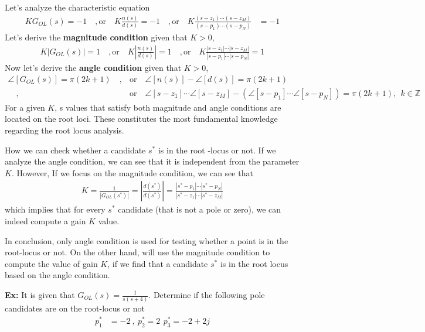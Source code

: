 \documentclass[twoside]{article}
\begin{document}
Let's analyze the characteristic equation 
%
\begin{align*}
K G_{OL}(s) = -1 \quad , \mathrm{or} \quad K \frac{n(s)}{d(s)} = -1 
\quad , \mathrm{or} \quad 
K \frac{(s - z_1) \cdots (s - z_M)}{(s - p_1) \cdots (s - p_N)} 
&= -1
\end{align*}
%
Let's derive the \textbf{magnitude condition} given that $K > 0$,
%
\begin{align*}
K | G_{OL}(s) | = 1 \quad , \mathrm{or} \quad K  \left| \frac{n(s)}{d(s)} \right| = 1 
\quad , \mathrm{or} \quad 
K \frac{|s - z_1| \cdots |s - z_M|}{|s - p_1| \cdots |s - p_N|}  = 1
\end{align*}
%
Now let's derive the \textbf{angle condition} given that $K > 0$,
%
\begin{align*}
\angle [ G_{OL}(s) ] = \pi (2 k + 1) 
\quad ,  &\mathrm{or} \quad 
\angle [n(s)] - \angle [d(s)] = \pi (2 k + 1) 
\\
\quad , &\mathrm{or} \quad 
\angle [s - z_1] \cdots \angle [s - z_M] - \left( \angle [s - p_1] \cdots \angle [s - p_N] \right)
= \pi (2 k + 1), 
\ \ k \in \mathbb{Z} 
\end{align*}
%
For a given $K$, s values that satisfy both magnitude and angle
conditions are located on the root loci. These constitutes the most
fundamental knowledge regarding the root locus analysis.

How we can check whether a candidate $s^*$ is in the root -locus or not.
If we analyze the angle condition, we can see that it is independent 
from the parameter $K$. However, If we focus on the magnitude condition, 
we can see that 
%
\begin{align*}
K = \frac{1}{| G_{OL}(s^*) |} = \left| \frac{d(s^*)}{d(s^*)} \right| = 
\frac{|s^* - p_1| \cdots |s^* - p_N|}{|s^* - z_1| \cdots |s^* - z_M|} 
\end{align*}
%
which implies that for every $s^*$ candidate (that is not a pole or zero), 
we can indeed compute a gain $K$ value.

In conclusion, only angle condition is used for testing 
whether a point is in the root-locus or not. On the other hand, 
will use the magnitude condition to compute the 
value of gain $K$, if we find that a candidate $s^*$
is in the root locus based on the angle condition.

\newpage

\textbf{Ex:} It is given that $G_{OL}(s) = \frac{1}{s (s+4)}$.
Determine if the following pole candidates are on the 
root-locus or not
%
\begin{align*}
	p_1^* &= -2  \ , \  p_2^* = 2 \,\ p_3^* = -2 + 2 j
\end{align*}
 
\end{document}
